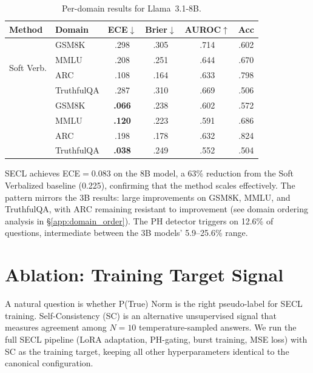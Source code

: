 \begin{table}[h]
\centering
\caption{Per-domain results for Llama~3.1-8B.}
\label{tab:8b_per_domain}
\small
\begin{tabular}{@{}llcccc@{}}
\toprule
\textbf{Method} & \textbf{Domain}
  & \textbf{ECE}$\downarrow$ & \textbf{Brier}$\downarrow$
  & \textbf{AUROC}$\uparrow$ & \textbf{Acc} \\
\midrule
\multirow{4}{*}{Soft Verb.}
  & GSM8K      & .298 & .305 & .714 & .602 \\
  & MMLU       & .208 & .251 & .644 & .670 \\
  & ARC        & .108 & .164 & .633 & .798 \\
  & TruthfulQA & .287 & .310 & .669 & .506 \\
\addlinespace
\multirow{4}{*}{SECL}
  & GSM8K      & \textbf{.066} & .238 & .602 & .572 \\
  & MMLU       & \textbf{.120} & .223 & .591 & .686 \\
  & ARC        & .198 & .178 & .632 & .824 \\
  & TruthfulQA & \textbf{.038} & .249 & .552 & .504 \\
\bottomrule
\end{tabular}
\end{table}

SECL achieves ECE$=$0.083 on the 8B model, a 63\% reduction from the
Soft Verbalized baseline (0.225), confirming that the method scales
effectively. The pattern mirrors the 3B results: large improvements
on GSM8K, MMLU, and TruthfulQA, with ARC remaining resistant to
improvement (see domain ordering analysis in \S\ref{app:domain_order}).
The PH detector triggers on 12.6\% of questions, intermediate between
the 3B models' 5.9--25.6\% range.


\section{Ablation: Training Target Signal}
\label{app:target_ablation}

A natural question is whether P(True) Norm is the right pseudo-label
for SECL training.
Self-Consistency (SC) is an alternative unsupervised signal that
measures agreement among $N{=}10$ temperature-sampled answers.
We run the full SECL pipeline (LoRA adaptation, PH-gating,
burst training, MSE loss) with SC as the training target, keeping
all other hyperparameters identical to the canonical configuration.

